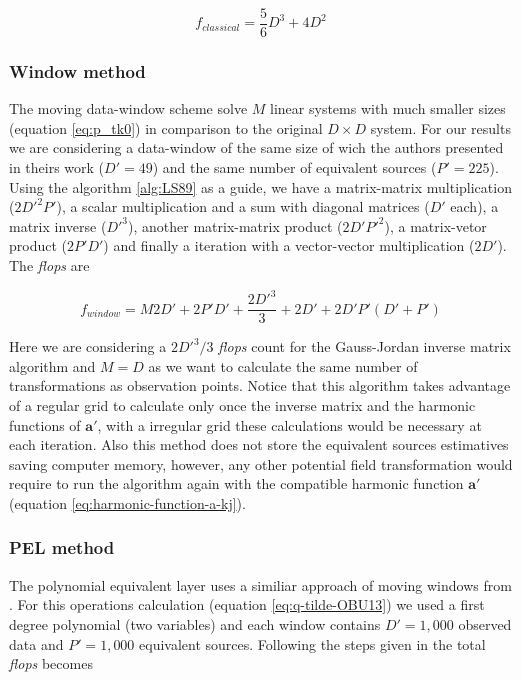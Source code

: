 \begin{equation}
	f_{classical} = \dfrac{5}{6} D^3 + 4D^2
\label{flops_classical}
\end{equation}

\subsubsection{Window method \citep{leao-silva1989}}

The moving data-window scheme \citep{leao-silva1989} solve $M$ linear systems with much smaller sizes (equation \ref{eq:p_tk0}) in comparison to the original $D \times D$ system. For our results we are considering a data-window of the same size of wich the authors presented in theirs work ($D' = 49$) and the same number of equivalent sources ($P' = 225$). Using the algorithm \ref{alg:LS89} as a guide, we have a matrix-matrix multiplication ($2D'^2P'$), a scalar multiplication and a sum with diagonal matrices ($D'$ each), a matrix inverse ($D'^3$), another matrix-matrix product ($2D'P'^2$), a matrix-vetor product ($2P'D'$) and finally a iteration with a vector-vector multiplication ($2D'$). The \textit{flops} are

\begin{equation}
	f_{window} = M2D' + 2P'D' + \dfrac{2D'^{3}}{3} + 2D' + 2D'P'(D'+P')
\label{flops_leao-silva}
\end{equation}

Here we are considering a $2D'^{3}/3$ \textit{flops} count for the Gauss-Jordan inverse matrix algorithm and $M = D$ as we want to calculate the same number of transformations as observation points. Notice that this algorithm takes advantage of a regular grid to calculate only once the inverse matrix and the harmonic functions of $\mathbf{a}'$, with a irregular grid these calculations would be necessary at each iteration. Also this method does not store the equivalent sources estimatives saving computer memory, however, any other potential field transformation would require to run the algorithm again with the compatible harmonic function $\mathbf{a}'$ (equation \ref{eq:harmonic-function-a-kj}).

\subsubsection{PEL method \citep{oliveirajr-etal2013}}

The polynomial equivalent layer uses a similiar approach of moving windows from \cite{leao-silva1989}. For this operations calculation (equation \ref{eq:q-tilde-OBU13}) we used a first degree polynomial (two variables) and each window contains $D' = 1,000$ observed data and $P' = 1,000$ equivalent sources. Following the steps given in \citep{oliveirajr-etal2013} the total \textit{flops} becomes

